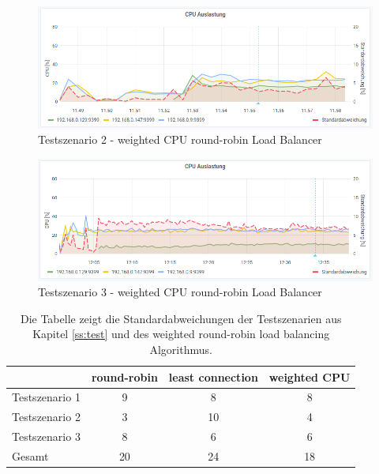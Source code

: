 \begin{figure}
    \centering
    \includegraphics[scale=0.8]{images/s2_cpu.png}
    \caption{Testszenario 2 - weighted CPU round-robin Load Balancer}
    \label{fig:s2-cpu}
\end{figure}
\begin{figure}
    \centering
    \includegraphics[scale=0.8]{images/s3_cpu.png}
    \caption{Testszenario 3 - weighted CPU round-robin Load Balancer}
    \label{fig:s3-cpu}
\end{figure}

\begin{table}[h!]
\centering
\renewcommand{\arraystretch}{1.5}
\begin{tabular}{|l|c|c|c|}
    \hline
    & round-robin & least connection & weighted CPU \\
    \hline
    Testszenario 1 & 9 & 8 & 8 \\
    \hline
    Testszenario 2 & 3 & 10 & 4 \\
    \hline
    Testszenario 3 & 8 & 6 & 6 \\
    \hline
    \hline
    Gesamt & 20 & 24 & 18 \\
    \hline
\end{tabular}
\caption{Die Tabelle zeigt die Standardabweichungen der Testszenarien aus Kapitel \ref{ss:test} und des weighted round-robin load balancing Algorithmus.}
\label{table:test-output}
\end{table}

